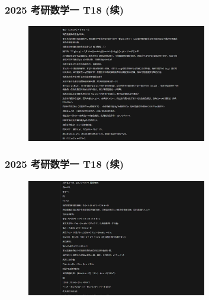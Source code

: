 \begin{frame}
\frametitle{2025 考研数学一 T18 (续)}
\begin{figure}
    \centering
    \includegraphics[width=0.7\textwidth]{./pic/13.png} %
    \label{fig:kaoyan_solution_5}
\end{figure}
\end{frame}

\begin{frame}
\frametitle{2025 考研数学一 T18 (续)}
\begin{figure}
    \centering
    \includegraphics[width=0.7\textwidth]{./pic/14.png} %
    \label{fig:kaoyan_solution_6}
\end{figure}
\end{frame}

